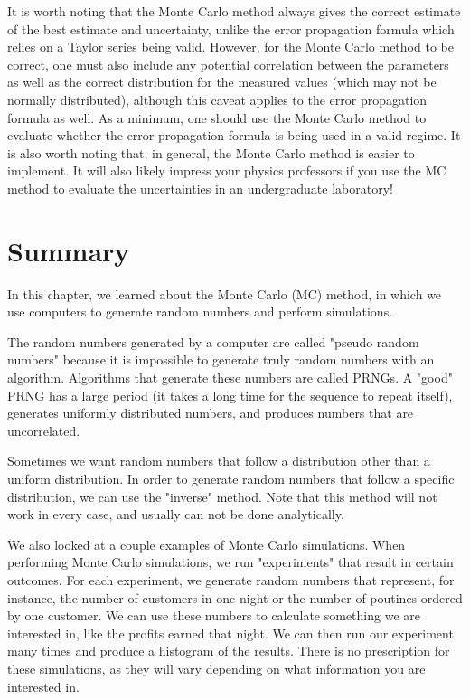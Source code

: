 It is worth noting that the Monte Carlo method always gives the correct estimate of the best estimate and uncertainty, unlike the error propagation formula which relies on a Taylor series being valid. However, for the Monte Carlo method to be correct, one must also include any potential correlation between the parameters as well as the correct distribution for the measured values (which may not be normally distributed), although this caveat applies to the error propagation formula as well. As a minimum, one should use the Monte Carlo method to evaluate whether the error propagation formula is being used in a valid regime. It is also worth noting that, in general, the Monte Carlo method is easier to implement. It will also likely impress your physics professors if you use the MC method to evaluate the uncertainties in an undergraduate laboratory!

\section{Summary}
In this chapter, we learned about the Monte Carlo (MC) method, in which we use computers to generate random numbers and perform simulations.

The random numbers generated by a computer are called "pseudo random numbers" because it is impossible to generate truly random numbers with an algorithm. Algorithms that generate these numbers are called PRNGs. A "good" PRNG has a large period (it takes a long time for the sequence to repeat itself), generates uniformly distributed numbers, and produces numbers that are uncorrelated.

Sometimes we want random numbers that follow a distribution other than a uniform distribution. In order to generate random numbers that follow a specific distribution, we can use the "inverse" method. Note that this method will not work in every case, and usually can not be done analytically.

We also looked at a couple examples of Monte Carlo simulations. When performing Monte Carlo simulations, we run "experiments" that result in certain outcomes. For each experiment, we generate random numbers that represent, for instance, the number of customers in one night or the number of poutines ordered by one customer. We can use these numbers to calculate something we are interested in, like the profits earned that night. We can then run our experiment many times and produce a histogram of the results. There is no prescription for these simulations, as they will vary depending on what information you are interested in.

